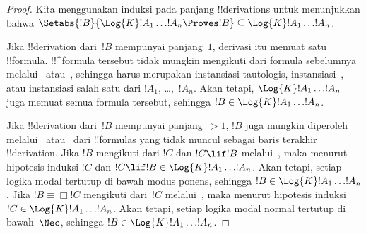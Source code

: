 \documentclass[../../../include/open-logic-section]{subfiles}
\begin{document}
\begin{proof}
  Kita menggunakan induksi pada panjang !!{derivation}s untuk menunjukkan
  bahwa
  $\Setabs{!B}{\Log{K} !A_1 \dots !A_n\Proves !B}\subseteq
  \Log{K} !A_1 \dots !A_n$.

  Jika !!{derivation} dari~$!B$ mempunyai panjang~$1$, derivasi itu memuat satu
  !!{formula}. !!^{formula} tersebut tidak mungkin mengikuti dari formula
  sebelumnya melalui~\MP{} atau~\Nec, sehingga harus merupakan instansiasi
  tautologis, instansiasi~, atau
  instansiasi salah satu dari $!A_1$, \dots,~$!A_n$. Akan tetapi,
  $\Log{K}!A_1\dots!A_n$ juga memuat semua formula tersebut, sehingga
  $!B\in\Log{K}!A_1\dots !A_n$.

  Jika !!{derivation} dari~$!B$ mempunyai panjang~$>1$, $!B$ juga mungkin
  diperoleh melalui~\MP{} atau~\Nec{} dari !!{formula}s yang tidak muncul
  sebagai baris terakhir !!{derivation}. Jika $!B$ mengikuti dari $!C$ dan
  $!C\lif !B$ melalui~\MP, maka menurut hipotesis induksi
  $!C$ dan $!C\lif !B\in\Log{K}!A_1\dots !A_n$. Akan tetapi, setiap logika
  modal tertutup di bawah modus ponens, sehingga
  $!B\in\Log{K}!A_1\dots !A_n$. Jika $!B\equiv\Box !C$ mengikuti dari~$!C$
  melalui~\Nec, maka menurut hipotesis induksi
  $!C\in\Log{K}!A_1\dots !A_n$. Akan tetapi, setiap logika modal normal
  tertutup di bawah~$\Nec$, sehingga $!B\in\Log{K}!A_1\dots!A_n$.


\end{proof}
\end{document}
